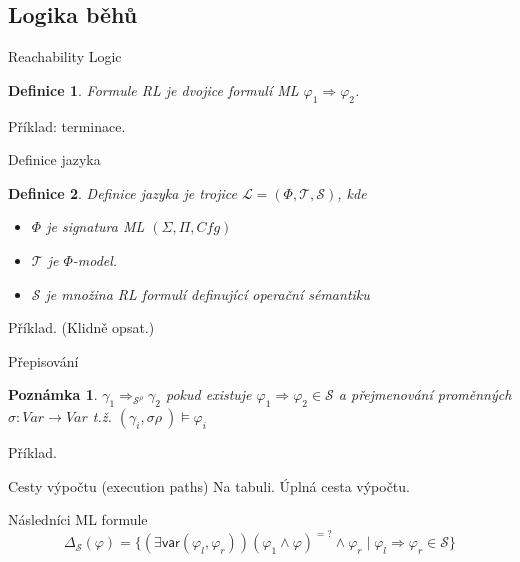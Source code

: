 \documentclass[11pt]{beamer}
\newtheorem{dfn}{Definice}
\newtheorem{pozn}{Poznámka}
\newcommand{\Var}{\mathit{Var}}
\newcommand{\mlSignature}{\ensuremath{\left( \Sigma, \Pi, \mathit{Cfg} \right)}}
\begin{document}

\subsection{Logika běhů}

\begin{frame}{Reachability Logic}

\begin{dfn}
Formule RL je dvojice formulí ML $\varphi_1 \Rightarrow \varphi_2$.
\end{dfn}
\pause
Příklad: terminace.

\end{frame}


\begin{frame}{Definice jazyka}

\begin{dfn}
Definice jazyka je trojice $\mathcal{L} = \left( \Phi, \mathcal{T}, \mathcal{S} \right)$, kde
\begin{itemize}
\pause \item $\Phi$ je signatura ML $\mlSignature$
\pause \item $\mathcal{T}$ je $\Phi$-model.
\pause \item $\mathcal{S}$ je množina RL formulí \pause definující operační sémantiku
\end{itemize}
\end{dfn}
\pause
Příklad. (Klidně opsat.)
\end{frame}

\begin{frame}{Přepisování}
\begin{pozn}
$\gamma_1 \Rightarrow_{\mathcal{S}^{\rho}} \gamma_2$ pokud existuje $\varphi_1 \Rightarrow \varphi_2 \in \mathcal{S}$ a přejmenování proměnných $\sigma : \Var \rightarrow \Var$ t.ž. $\left( \gamma_i , \sigma \rho \ \right) \models \varphi_i$
\end{pozn}
\pause
Příklad.
\end{frame}

\begin{frame}{Cesty výpočtu (execution paths)}
Na tabuli.
\pause Úplná cesta výpočtu.
\end{frame}

\begin{frame}{Následníci ML formule}
\begin{equation*}
\Delta_{\mathcal{S}}\left( \varphi \right) =
\lbrace \left( \exists \mathsf{var} \left( \varphi_l , \varphi_r \right) \right) \left( \varphi_1 \land \varphi \right)^{=?} \land \varphi_r \mid \varphi_l \Rightarrow \varphi_r \in \mathcal{S} \rbrace
\end{equation*}
\end{frame}
\end{document}
